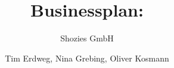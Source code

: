 \title{Businessplan:}
\subtitle{Shozies GmbH}
\author{Tim Erdweg, Nina Grebing, Oliver Kosmann}
\begin{titlepage}
		\maketitle
\end{titlepage}